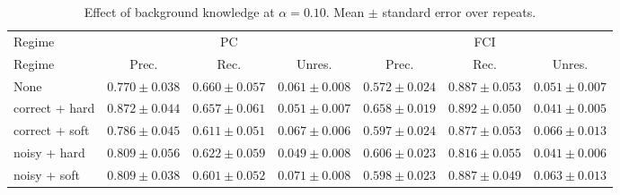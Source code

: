 \begin{table}[t]
\centering\small
\begin{tabular}{lcccccc}
\toprule
Regime & \multicolumn{3}{c}{PC} & \multicolumn{3}{c}{FCI} \\
\cmidrule(lr){2-4}
\cmidrule(lr){5-7}
Regime & Prec. & Rec. & Unres. & Prec. & Rec. & Unres. \\
\midrule
None & $0.770 \pm 0.038$ & $0.660 \pm 0.057$ & $0.061 \pm 0.008$ & $0.572 \pm 0.024$ & $0.887 \pm 0.053$ & $0.051 \pm 0.007$ \\
correct + hard & $0.872 \pm 0.044$ & $0.657 \pm 0.061$ & $0.051 \pm 0.007$ & $0.658 \pm 0.019$ & $0.892 \pm 0.050$ & $0.041 \pm 0.005$ \\
correct + soft & $0.786 \pm 0.045$ & $0.611 \pm 0.051$ & $0.067 \pm 0.006$ & $0.597 \pm 0.024$ & $0.877 \pm 0.053$ & $0.066 \pm 0.013$ \\
noisy + hard & $0.809 \pm 0.056$ & $0.622 \pm 0.059$ & $0.049 \pm 0.008$ & $0.606 \pm 0.023$ & $0.816 \pm 0.055$ & $0.041 \pm 0.006$ \\
noisy + soft & $0.809 \pm 0.038$ & $0.601 \pm 0.052$ & $0.071 \pm 0.008$ & $0.598 \pm 0.023$ & $0.887 \pm 0.049$ & $0.063 \pm 0.013$ \\
\bottomrule
\end{tabular}
\caption{Effect of background knowledge at $\alpha=0.10$. Mean $\pm$ standard error over repeats.}
\label{tab:knowledge}
\end{table}
